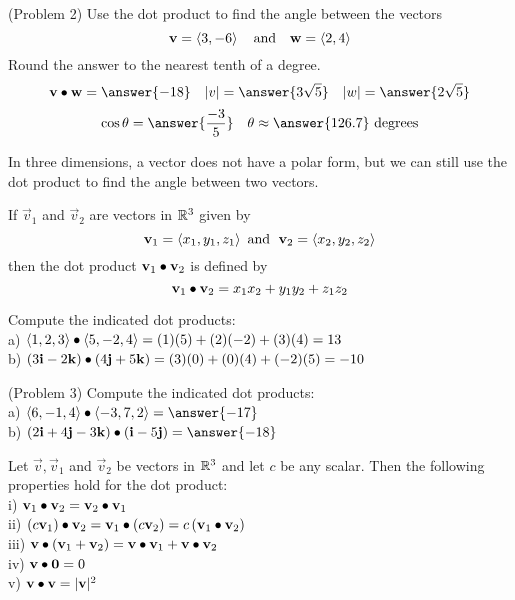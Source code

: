 \documentclass[handout]{ximera}
\begin{document}
\begin{problem}(Problem 2) Use the dot product to find the angle between the vectors 
\[
\mathbf v = \left\langle 3,-6\right\rangle \quad \text{and} \quad \mathbf w = \left\langle 2,4\right\rangle
\]
Round the answer to the nearest tenth of a degree.\\
\[
\vec v \dotp \vec w = \answer{-18} \quad |v| = \answer{3\sqrt{5}} \quad |w| = \answer{2\sqrt{5}}
\]
\[
\cos \theta = \answer{\frac{-3}{5}} \quad \theta \approx \answer{126.7} \text{ degrees}
\]
\end{problem}


In three dimensions, a vector does not have a polar form, but we can still use the dot product to find the angle between two vectors.
\begin{definition}
If $\vec{v}_1$ and $\vec{v}_2$ are vectors in $\mathbb R^3$ given by
\[
\mathbf{v}_1 = \left\langle x_1, y_1, z_1\right\rangle \text{  and   } \;\mathbf{v}_2 = \left\langle x_2, y_2, z_2\right\rangle
\]
then the dot product $\mathbf{v}_1 \bullet \mathbf{v}_2$ is defined by
\[
\mathbf{v}_1 \bullet \mathbf{v}_2 = x_1x_2 + y_1y_2 + z_1z_2
\]
\end{definition}

\begin{example}[Example 3]
Compute the indicated dot products:\\
a) $\left\langle 1, 2, 3\right\rangle \bullet \left\langle 5, -2, 4\right\rangle = (1)(5)+ (2)(-2) + (3)(4) = 13$\\
b) $\left(3\mathbf{i} - 2\mathbf{k}\right) \bullet \left(4\mathbf{j} + 5\mathbf{k}\right) = (3)(0) + (0)(4) + (-2)(5) = -10$
\end{example}

\begin{problem}(Problem 3)
Compute the indicated dot products:\\
a) $\vector{6, -1, 4} \dotp \vector{-3, 7, 2} = \answer{-17}$\\
b) $\left(2\vec{i} + 4\vec{j} - 3\vec{k}\right) \dotp \left(\vec{i} -5\vec{j}\right) = \answer{-18}$
\end{problem}

\begin{proposition}
Let $\vec{v} , \vec{v}_1 $ and $ \vec{v}_2$ be vectors in $\mathbb R^3$ and let $c$ be any scalar. 
Then the following properties hold for the dot product:\\
i) $\mathbf{v}_1 \bullet \mathbf{v}_2 =\mathbf{v}_2 \bullet \mathbf{v}_1$\\
ii) $\left(c\mathbf{v}_1\right) \bullet \mathbf{v}_2 =\mathbf{v}_1 \bullet \left(c\mathbf{v}_2\right) = c\left(\mathbf{v}_1 \bullet \mathbf{v}_2\right)$\\
iii)  $\mathbf{v} \bullet \left(\mathbf{v}_1 +\mathbf{v}_2\right) =\mathbf{v} \bullet\mathbf{v}_1 +\mathbf{v}\bullet \mathbf{v}_2$\\
iv) $\mathbf{v} \bullet \mathbf{0} = 0$\\
v) $\mathbf{v} \bullet \mathbf{v} = |\mathbf{v}|^2$
\end{proposition}
\end{document}
